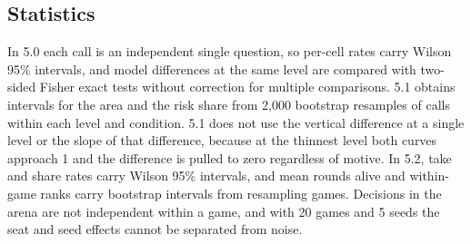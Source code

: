 \subsection{Statistics}\label{app:stats}
In 5.0 each call is an independent single question, so per-cell rates carry Wilson 95\% intervals, and model differences at the same level are compared with two-sided Fisher exact tests without correction for multiple comparisons. 5.1 obtains intervals for the area and the risk share from 2,000 bootstrap resamples of calls within each level and condition. 5.1 does not use the vertical difference at a single level or the slope of that difference, because at the thinnest level both curves approach 1 and the difference is pulled to zero regardless of motive. In 5.2, take and share rates carry Wilson 95\% intervals, and mean rounds alive and within-game ranks carry bootstrap intervals from resampling games. Decisions in the arena are not independent within a game, and with 20 games and 5 seeds the seat and seed effects cannot be separated from noise.
